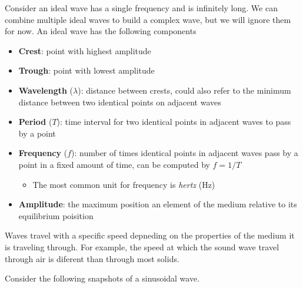 Consider an ideal wave has a single frequency and is infinitely long. We can combine multiple ideal 
waves to build a complex wave, but we will ignore them for now. An ideal wave has the following 
components
\begin{itemize}
    \item \textbf{Crest}: point with highest amplitude
    \item \textbf{Trough}: point with lowest amplitude
    \item \textbf{Wavelength} ($\lambda$): distance between crests, could also refer to the minimum distance
        between two identical points on adjacent waves
    \item \textbf{Period} ($T$): time interval for two identical points in adjacent waves to pass by
        a point
    \item \textbf{Frequency} ($f$): number of times identical points in adjacent waves pass by
        a point in a fixed amount of time, can be computed by $f = 1/T$
        \begin{itemize}
            \item The most common unit for frequency is \textit{hertz} (Hz)
        \end{itemize}
    \item \textbf{Amplitude}: the maximum position an element of the medium relative to its equilibrium poisition
\end{itemize}

Waves travel with a specific speed depneding on the properties of the medium it is traveling through.
For example, the speed at which the sound wave travel through air is diferent than through most solids.

Consider the following snapshots of a sinusoidal wave.

